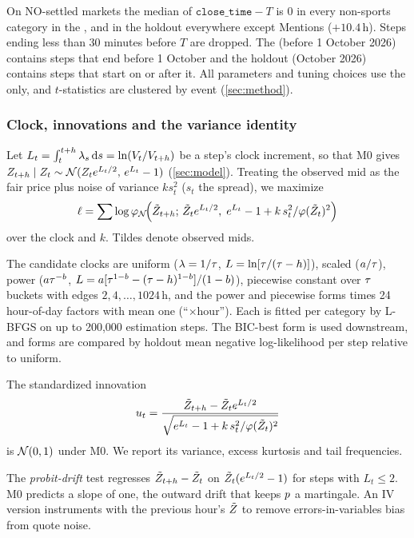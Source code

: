 On NO-settled markets the median of $\texttt{close\_time}-T$ is 0 in every non-sports category in
the \estim{}, and in the holdout everywhere except Mentions ($+10.4$\,h).
Steps ending less than 30 minutes before $T$ are dropped. The \estim{} (before 1 October 2026)
contains steps that end before 1 October and the holdout (October 2026) contains steps that start on
or after it. All parameters and tuning choices use the \estim{} only, and $t$-statistics are
clustered by event (\cref{sec:method}).

\subsubsection{Clock, innovations and the variance identity}\label{sec:dyn-clock}

Let $L_t=\int_t^{t+h}\lambda_s\,\mathrm{d} s=\ln(V_t/V_{t+h})$ be a step's clock increment, so that
M0 gives $Z_{t+h}\mid Z_t\sim\mathcal{N}(Z_t e^{L_t/2},\,e^{L_t}-1)$ (\cref{sec:model}). Treating the
observed mid as the fair price plus noise of variance $k s_t^2$ ($s_t$ the spread), we maximize
\begin{equation}\label{eq:dyn-nll}
\ell=\sum\log\varphi_{\mathcal{N}}\!\Big(\tilde{Z}_{t+h};\,\tilde{Z}_t e^{L_t/2},\;e^{L_t}-1+k\,s_t^2/\varphi(\tilde{Z}_t)^2\Big)
\end{equation}
over the clock and $k$. Tildes denote observed mids.

The candidate clocks are uniform ($\lambda=1/\tau$, $L=\ln[\tau/(\tau-h)]$), scaled
($a/\tau$), power ($a\tau^{-b}$, $L=a[\tau^{1-b}-(\tau-h)^{1-b}]/(1-b)$), piecewise
constant over $\tau$ buckets with edges $2,4,\ldots,1024$\,h, and the power and piecewise forms
times 24 hour-of-day factors with mean one (``$\times$hour''). Each is fitted per category by
L-BFGS on up to 200{,}000 estimation steps. The BIC-best form is used downstream, and forms are
compared by holdout mean negative log-likelihood per step relative to uniform.

The standardized innovation
\begin{equation}\label{eq:dyn-u}
u_t=\frac{\tilde{Z}_{t+h}-\tilde{Z}_t e^{L_t/2}}{\sqrt{e^{L_t}-1+k\,s_t^2/\varphi(\tilde{Z}_t)^2}}
\end{equation}
is $\mathcal{N}(0,1)$ under M0. We report its variance, excess kurtosis and tail frequencies.

The \emph{probit-drift} test regresses $\tilde{Z}_{t+h}-\tilde{Z}_t$ on $\tilde{Z}_t(e^{L_t/2}-1)$ for
steps with $L_t\le2$. M0 predicts a slope of one, the outward drift that keeps $p$ a martingale.
An IV version instruments with the previous hour's $\tilde{Z}$ to remove errors-in-variables bias
from quote noise.

